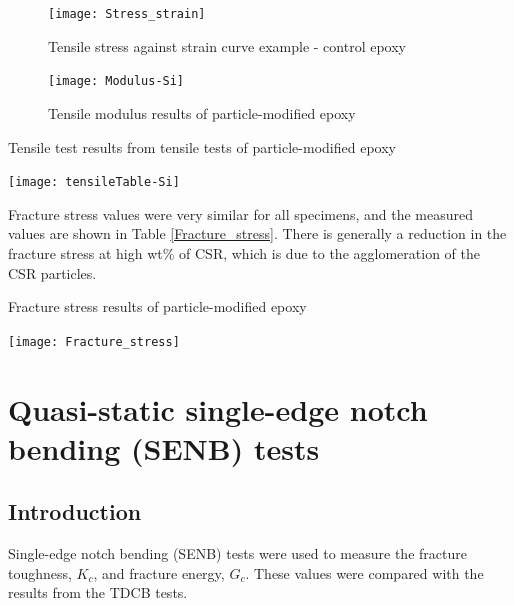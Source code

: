 \documentclass[numbers=noendperiod,chapterprefix=on]{icldt} %
\begin{document}
\begin{figure}[!htpb]
\centering
\texttt{[image: Stress\_strain]}
\caption{Tensile stress against strain curve example - control epoxy} \label{Stress_strain}
\end{figure}
\FloatBarrier


\begin{figure}[!htpb]
\centering
\texttt{[image: Modulus-Si]}
\caption{Tensile modulus results of particle-modified epoxy } \label{Modulus-Si}
\end{figure}
\FloatBarrier

\begin{table}[!htpb]
\centering
\caption{Tensile test results from tensile tests of particle-modified epoxy} \label{tensileTable-Si}
\texttt{[image: tensileTable-Si]}
\end{table}
\FloatBarrier

Fracture stress values were very similar for all specimens, and the measured values are shown in Table \ref{Fracture_stress}. %
There is generally a reduction in the fracture stress at high wt\% of CSR, which is due to the agglomeration of the CSR particles.

\begin{table}[!htpb]
\centering
\caption{Fracture stress results of particle-modified epoxy} \label{Fracture_stress}
\texttt{[image: Fracture\_stress]}
\end{table}
\FloatBarrier


\section{Quasi-static single-edge notch bending (SENB) tests} \label{SENB}
\subsection{Introduction}
Single-edge notch bending (SENB) tests were used to measure the fracture toughness, $K_c$, and fracture energy, $G_c$. These values were compared with the results from the TDCB tests. 

\end{document}
